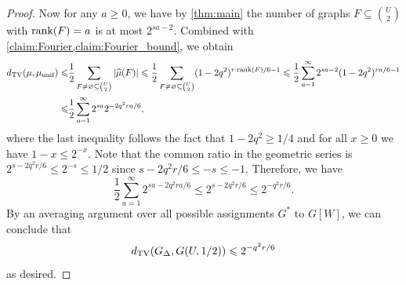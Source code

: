 \documentclass[reqno]{amsart}
\theoremstyle{definition}
\numberwithin{theorem}{section}
\renewcommand{\leq}{\le}
\renewcommand{\geq}{\ge}
\renewcommand{\le}{\leqslant}
\renewcommand{\ge}{\geqslant}
\newcommand{\rank}{\textup{rank}}
\begin{document}
\begin{proof}
    Now for any $a\ge 0$, we have by \cref{thm:main} the number of graphs $F\subseteq \binom{U}{2}$ with $\rank(F) = a$ is at most $2^{sa-2}$. Combined with \cref{claim:Fourier,claim:Fourier_bound}, we obtain
    \begin{align*}
        d_{\textup{TV}}(\mu,\mu_{\textup{unif}})\leq &\frac{1}{2}\sum_{F\ne\varnothing\subseteq \binom{U}{2}}|\widehat{\mu}(F)|
        \leq \frac{1}{2}\sum_{F\ne\varnothing\subseteq \binom{U}{2}}(1-2q^2)^{r\cdot\rank(F)/6-1}
        \leq \frac{1}{2}\sum_{a=1}^\infty 2^{sa-2}(1-2q^2)^{ra/6-1}\\
        \leq &\frac{1}{2}\sum_{a=1}^\infty 2^{sa}2^{-2q^2ra/6},
    \end{align*}
    where the last inequality follows the fact that $1-2q^2\geq 1/4$ and for all $x\geq 0$ we have $1-x\leq 2^{-x}$. Note that the common ratio in the geometric series is $2^{s-2q^2r/6}\le 2^{-s}\le 1/2$ since $s-2q^2r/6\leq -s\leq -1$. Therefore, we have
    \[\frac{1}{2}\sum_{a=1}^\infty 2^{sa-2q^2ra/6}\leq 2^{s-2q^2r/6}\leq 2^{-q^2r/6}.\]
    By an averaging argument over all possible assignments $G^*$ to $G[W]$, we can conclude that
    \[d_{\textup{TV}}(G_{\Delta},G(U,1/2))\leq 2^{-q^2r/6}\]
    as desired.
\end{proof}
\end{document}
